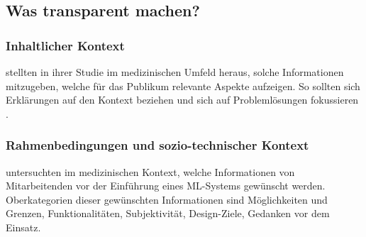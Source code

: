 \subsection{Was transparent machen?}
\subsubsection{Inhaltlicher Kontext}
\cite{sendak2020human} stellten in ihrer Studie im medizinischen Umfeld heraus, solche Informationen mitzugeben, welche für das Publikum relevante Aspekte aufzeigen. So sollten sich Erklärungen auf den Kontext beziehen und sich auf Problemlösungen fokussieren \cite{sendak2020human}.

\subsubsection{Rahmenbedingungen und sozio-technischer Kontext}
\cite{cai2019hello} untersuchten im medizinischen Kontext, welche Informationen von Mitarbeitenden vor der Einführung eines ML-Systems gewünscht werden. Oberkategorien dieser gewünschten Informationen sind Möglichkeiten und Grenzen, Funktionalitäten, Subjektivität, Design-Ziele, Gedanken vor dem Einsatz.

